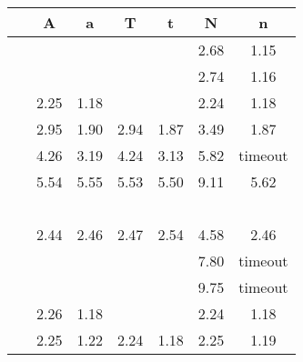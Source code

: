 \begin{table}[htb]   
    \renewcommand{\arraystretch}{1.2}
    \centering
\begin{tabular}{|c|c|c|c|c|c|c |}
    \hline
     &\;\;A\;\;&\;\;a\;\;&\;\;T\;\;&\;\;t\;\;&\;\; N\;\;&\;\;n\;\; \\
    \hline
   ~\cite[Example 6.2]{endrullis2024generalized_arxiv_v2} & & & & & 2.68 &1.15   \\
   ~\cite[Example 6.3]{endrullis2024generalized_arxiv_v2} & & & & & 2.74 &1.16   \\
   ~\cite[Example D.3]{endrullis2024generalized_arxiv_v2} &2.25 
    & 1.18
    & & & 2.24& 1.18    \\
   ~\cite[Example 3.8]{plump1995ontermination}
 & 2.95& 1.90 & 2.94 &1.87  & 3.49  &1.87   \\
   ~\cite[Example 4]{plump2018modular} &4.26& 3.19&  4.24 & 3.13 &
    5.82
    & timeout  \\

   ~\cite[Example 5]{plump2018modular} & 5.54
    &5.55
    & 5.53& 5.50& 9.11&  5.62  \\
   ~\cite[Example 6]{plump2018modular} &  &  & & &  &   \\
   ~\cite[Example 4]{bruggink2015proving} &
    2.44
    & 
    2.46
    & 
    2.47
    &
    2.54
    & 4.58 & 
    2.46
     \\
   ~\cite[Example 5]{bruggink2015proving} &  &  &&& 7.80& timeout  \\
   ~\cite[Example 6]{bruggink2015proving} &  &  &&& 9.75& timeout   \\
   ~\cite[Example 1]{bruggink2014termination} & 
     2.26
     &1.18
     & & &2.24
     & 1.18  
     \\
   ~\cite[Example 4]{bruggink2014termination} &  2.25
    & 1.22 & 2.24
    &1.18
    &2.25
    & 1.19 


\end{tabular}
\end{table}
